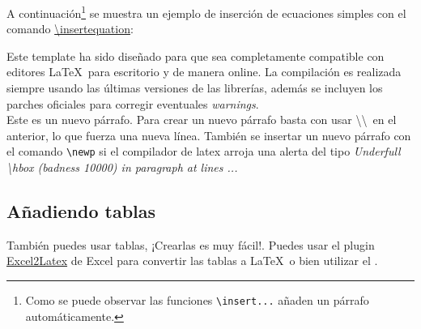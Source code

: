
	A continuación\footnote{Como se puede observar las funciones \texttt{\textbackslash insert...} añaden un párrafo automáticamente.} se muestra un ejemplo de inserción de ecuaciones simples con el comando \href{https://latex.ppizarror.com/informe.html#hlp-formulae}{\textbackslash insertequation}:


	Este template \cite{template} ha sido diseñado para que sea completamente compatible con editores \LaTeX\ para escritorio y de manera online. La compilación es realizada siempre usando las últimas versiones de las librerías, además se incluyen los parches oficiales para corregir eventuales \textit{warnings}. \\

	Este es un nuevo párrafo. Para crear un nuevo párrafo basta con usar \textbackslash\textbackslash\ en el anterior, lo que fuerza una nueva línea. También se insertar un nuevo párrafo con el comando \texttt{\textbackslash newp} si el compilador de latex arroja una alerta del tipo \textit{Underfull \textbackslash hbox (badness 10000) in paragraph at lines ...}

\subsection{Añadiendo tablas}

	También puedes usar tablas, ¡Crearlas es muy fácil!. Puedes usar el plugin \href{https://www.ctan.org/tex-archive/support/excel2latex}{Excel2Latex} \cite{excel2latex} de Excel para convertir las tablas a \LaTeX\ o bien utilizar el  \cite{tablesgenerator}.


